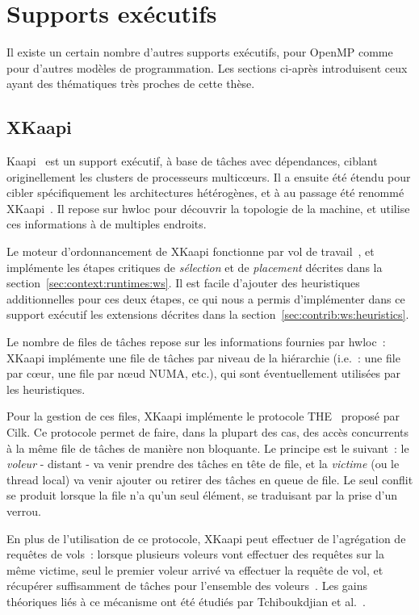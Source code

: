 \section{Supports exécutifs}\label{sec:rw:other-runtimes}

Il existe un certain nombre d'autres supports exécutifs, pour OpenMP comme pour d'autres modèles de programmation.
Les sections ci-après introduisent ceux ayant des thématiques très proches de cette thèse.

\subsection{XKaapi}

Kaapi~\cite{Gautier2007} est un support exécutif, à base de tâches avec dépendances, ciblant originellement les clusters de processeurs multicœurs.
Il a ensuite été étendu pour cibler spécifiquement les architectures hétérogènes, et à au passage été renommé XKaapi~\cite{Gautier2013}.
Il repose sur hwloc pour découvrir la topologie de la machine, et utilise ces informations à de multiples endroits.

Le moteur d'ordonnancement de XKaapi fonctionne par vol de travail~\cite{Lima2015}, et implémente les étapes critiques de \emph{sélection} et de \emph{placement} décrites dans la section~\ref{sec:context:runtimes:ws}. Il est facile d'ajouter des heuristiques additionnelles pour ces deux étapes, ce qui nous a permis d'implémenter dans ce support exécutif les extensions décrites dans la section~\ref{sec:contrib:ws:heuristics}.

Le nombre de files de tâches repose sur les informations fournies par hwloc~: XKaapi implémente une file de tâches par niveau de la hiérarchie (i.e.~: une file par cœur, une file par nœud NUMA, etc.), qui sont éventuellement utilisées par les heuristiques.

Pour la gestion de ces files, XKaapi implémente le protocole THE~\cite{cilk5} proposé par Cilk. Ce protocole permet de faire, dans la plupart des cas, des accès concurrents à la même file de tâches de manière non bloquante. Le principe est le suivant~: le \emph{voleur} - distant - va venir prendre des tâches en tête de file, et la \emph{victime} (ou le thread local) va venir ajouter ou retirer des tâches en queue de file.
Le seul conflit se produit lorsque la file n'a qu'un seul élément, se traduisant par la prise d'un verrou.

En plus de l'utilisation de ce protocole, XKaapi peut effectuer de l'agrégation de requêtes de vols~: lorsque plusieurs voleurs vont effectuer des requêtes sur la même victime, seul le premier voleur arrivé va effectuer la requête de vol, et récupérer suffisamment de tâches pour l'ensemble des voleurs~\cite{Besseron2009}.
Les gains théoriques liés à ce mécanisme ont été étudiés par Tchiboukdjian et al.~\cite{Tchiboukdjian2010a}.


